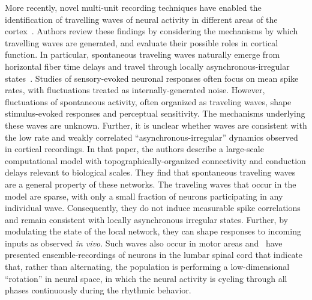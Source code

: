 \documentclass[brainsci, %
               review,submit,pdftex,moreauthors
               ]{Definitions/mdpi}
\begin{document}
More recently, novel multi-unit recording techniques have enabled the identification of travelling waves of neural activity in different areas of the cortex~\citep{muller_cortical_2018}. Authors review these findings by considering the mechanisms by which travelling waves are generated, and evaluate their possible roles in cortical function. In particular, spontaneous traveling waves naturally emerge from horizontal fiber time delays and travel through locally asynchronous-irregular states~\citep{davis_spontaneous_2021}. Studies of sensory-evoked neuronal responses often focus on mean spike rates, with fluctuations treated as internally-generated noise. However, fluctuations of spontaneous activity, often organized as traveling waves, shape stimulus-evoked responses and perceptual sensitivity. The mechanisms underlying these waves are unknown. Further, it is unclear whether waves are consistent with the low rate and weakly correlated ``asynchronous-irregular'' dynamics observed in cortical recordings. In that paper, the authors describe a large-scale computational model with topographically-organized connectivity and conduction delays relevant to biological scales. They find that spontaneous traveling waves are a general property of these networks. The traveling waves that occur in the model are sparse, with only a small fraction of neurons participating in any individual wave. Consequently, they do not induce measurable spike correlations and remain consistent with locally asynchronous irregular states. Further, by modulating the state of the local network, they can shape responses to incoming inputs as observed \textit{in vivo}. Such waves also occur in motor areas and~\citet{linden_movement_2021} have presented ensemble-recordings of neurons in the lumbar spinal cord that indicate that, rather than alternating, the population is performing a low-dimensional ``rotation'' in neural space, in which the neural activity is cycling through all phases continuously during the rhythmic behavior.
\end{document}
